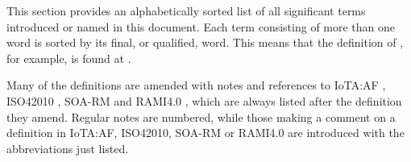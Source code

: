 %
%

This section provides an alphabetically sorted list of all significant terms introduced or named in this document.
Each term consisting of more than one word is sorted by its final, or qualified, word.
This means that the definition of , for example, is found at .

Many of the definitions are amended with notes and references to IoTA:AF \cite{delsing2017iot}, ISO42010 \cite{iso42010}, SOA-RM \cite{mackenzie2006reference} and RAMI4.0 \cite{adolphs2016reference}, which are always listed after the definition they amend.
Regular notes are numbered, while those making a comment on a definition in IoTA:AF, ISO42010, SOA-RM or RAMI4.0 are introduced with the abbreviations just listed.

